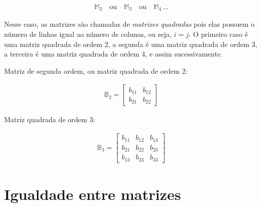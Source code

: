 \begin{ceqn}
	\begin{align*}
	\mathbb{M}_{2}\quad\mathrm{ou}\quad\mathbb{M}_{3}\quad\mathrm{ou\quad\mathbb{M}_{4}\,...}
	\end{align*}
\end{ceqn}

Nesse caso, as matrizes são chamadas de \textit{matrizes quadradas} pois elas possuem o número de linhas igual ao número de colunas, ou
seja, $i=j$. O primeiro caso é uma matriz quadrada de ordem 2, a segunda é uma matriz quadrada de ordem 3, a terceira é uma matriz
quadrada de ordem 4, e assim sucessivamente.
\begin{example}
	Matriz de segunda ordem, ou matriz quadrada de ordem 2:

\begin{ceqn}
	\begin{align*}
		\mathbb{B}_{2}=\begin{bmatrix}b_{11} & b_{12}\\
	b_{21} & b_{22}
	\end{bmatrix}
	\end{align*}
\end{ceqn}

\end{example}
%
\begin{example}
	Matriz quadrada de ordem 3:
	
\begin{ceqn}
	\begin{align*}
		\mathbb{B}_{3}=\begin{bmatrix}b_{11} & b_{12} & b_{13}\\
	b_{21} & b_{22} & b_{23}\\
	b_{13} & b_{23} & b_{33}
	\end{bmatrix}
	\end{align*}
\end{ceqn}

\end{example}


\section{Igualdade entre matrizes}

